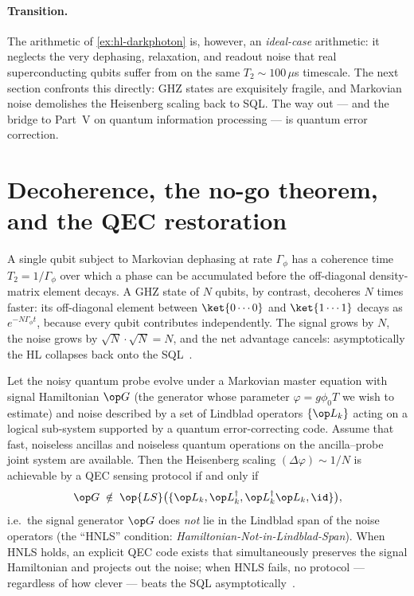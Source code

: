 \paragraph{Transition.}
The arithmetic of \cref{ex:hl-darkphoton} is, however, an
\emph{ideal-case} arithmetic: it neglects the very dephasing,
relaxation, and readout noise that real superconducting qubits
suffer from on the same $T_2\sim 100\,\mu$s timescale. The next
section confronts this directly: GHZ states are exquisitely
fragile, and Markovian noise demolishes the Heisenberg scaling
back to SQL. The way out --- and the bridge to Part~V on quantum
information processing --- is quantum error correction.

\section{Decoherence, the no-go theorem, and the QEC restoration}
\label{sec:qec-metrology}

\begin{phenomenon}
A single qubit subject to Markovian dephasing at rate
$\Gamma_\phi$ has a coherence time $T_2=1/\Gamma_\phi$ over
which a phase can be accumulated before the off-diagonal
density-matrix element decays. A GHZ state of $N$ qubits, by
contrast, decoheres $N$ times faster: its off-diagonal element
between $\ket{0\cdots 0}$ and $\ket{1\cdots 1}$ decays as
$e^{-N\Gamma_\phi t}$, because every qubit contributes
independently. The signal grows by $N$, the noise grows by
$\sqrt{N}\cdot\sqrt{N}=N$, and the net advantage cancels:
asymptotically the HL collapses back onto the
SQL~\cite{huelga1997,escher2011,demkowicz2012}.
\end{phenomenon}

\begin{statement}
\label{stmt:hnls}
Let the noisy quantum probe evolve under a Markovian master
equation with signal Hamiltonian $\op G$ (the generator whose
parameter $\varphi=g\phi_0 T$ we wish to estimate) and noise
described by a set of Lindblad operators $\{\op L_k\}$ acting
on a logical sub-system supported by a quantum
error-correcting code. Assume that fast,
noiseless ancillas and noiseless quantum operations on the
ancilla--probe joint system are available. Then the Heisenberg
scaling $(\Delta\varphi)\sim 1/N$ is achievable by a QEC sensing
protocol if and only if
\begin{equation}
\label{eq:hnls}
\op G \;\notin\; \op{LS}\bigl(\{\op L_k,\op L_k^\dagger,
\op L_k^\dagger\op L_k,\id\}\bigr),
\end{equation}
i.e.\ the signal generator $\op G$ does \emph{not} lie in
the Lindblad span of the noise operators (the ``HNLS''
condition: \emph{Hamiltonian-Not-in-Lindblad-Span}). When
HNLS holds, an explicit QEC code exists that simultaneously
preserves the signal Hamiltonian and projects out the noise;
when HNLS fails, no protocol --- regardless of how clever ---
beats the SQL asymptotically~\cite{zhou2018}.
\end{statement}

